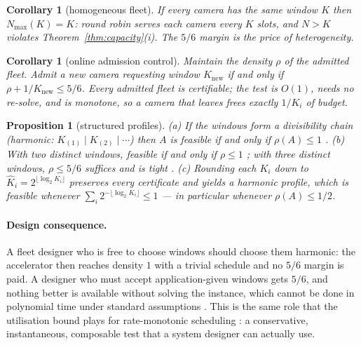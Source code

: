 \documentclass[preprint,review,12pt]{elsarticle}
\newtheorem{proposition}[theorem]{Proposition}
\newtheorem{corollary}[theorem]{Corollary}
\theoremstyle{definition}
\newcommand{\Ki}{K_i}
\newcommand{\dens}{\rho}
\begin{document}
\begin{corollary}[homogeneous fleet]\label{cor:homog}
If every camera has the same window $K$ then $N_{\max}(K)=K$: round robin serves each camera every
$K$ slots, and $N>K$ violates Theorem~\ref{thm:capacity}(i). The $5/6$ margin is the price of
heterogeneity.
\end{corollary}

\begin{corollary}[online admission control]\label{cor:admission}
Maintain the density $\dens$ of the admitted fleet. Admit a new camera requesting window
$K_{\mathrm{new}}$ if and only if $\dens+1/K_{\mathrm{new}}\le5/6$. Every admitted fleet is
certifiable; the test is $O(1)$, needs no re-solve, and is monotone, so a camera that leaves
frees exactly $1/\Ki$ of budget.
\end{corollary}

\begin{proposition}[structured profiles]\label{prop:structured}
(a) If the windows form a divisibility chain (\emph{harmonic}: $K_{(1)}\mid K_{(2)}\mid\cdots$)
then $A$ is feasible if and only if $\dens(A)\le1$ \cite{holte1989pinwheel}.
(b) With two distinct windows, feasible if and only if $\dens\le1$ \cite{holte1992two}; with three
distinct windows, $\dens\le5/6$ suffices and is tight \cite{linlin1997three}.
(c) Rounding each $\Ki$ \emph{down} to $\hat K_i=2^{\lfloor\log_2\Ki\rfloor}$ preserves every
certificate and yields a harmonic profile, which is feasible whenever
$\sum_i 2^{-\lfloor\log_2\Ki\rfloor}\le1$ --- in particular whenever $\dens(A)\le1/2$.
\end{proposition}

\paragraph{Design consequence.} A fleet designer who is free to choose windows should choose them
harmonic: the accelerator then reaches density $1$ with a trivial schedule and no $5/6$ margin is
paid. A designer who must accept application-given windows gets $5/6$, and nothing better is
available without solving the instance, which cannot be done in polynomial time under standard
assumptions \cite{kobayashi2025isaac}. This is the same role that the utilisation bound plays for
rate-monotonic scheduling \cite{liulayland1973}: a conservative, instantaneous, composable test
that a system designer can actually use.
\end{document}
